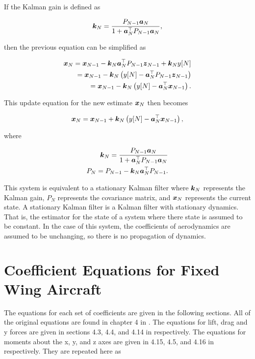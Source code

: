 If the Kalman gain is defined as

\begin{align}
  \boldsymbol{k}_N = \frac{P_{N-1} \boldsymbol{a}_N}{1 + \boldsymbol{a}_N^\top P_{N-1} \boldsymbol{a}_N},
\end{align}

then the previous equation can be simplified as

\begin{align}
    \boldsymbol{x}_N = \boldsymbol{x}_{N-1} - \boldsymbol{k}_N \boldsymbol{a}_N^\top P_{N-1} \boldsymbol{z}_{N-1} + \boldsymbol{k}_N y[N]\\
    = \boldsymbol{x}_{N-1} - \boldsymbol{k}_N \left(y[N] - \boldsymbol{a}_N^\top P_{N-1} \boldsymbol{z}_{N-1}\right)\\
    = \boldsymbol{x}_{N-1} - \boldsymbol{k}_N \left(y[N] - \boldsymbol{a}_N^\top \boldsymbol{x}_{N-1}\right).
\end{align}

This update equation for the new estimate $\boldsymbol{x}_N$ then becomes

\begin{align}
  \boldsymbol{x}_N = \boldsymbol{x}_{N-1} + \boldsymbol{k}_N \left(y[N] - \boldsymbol{a}_N^\top \boldsymbol{x}_{N-1}\right),
\end{align}

where

\begin{align}
    \boldsymbol{k}_N = \frac{P_{N-1} \boldsymbol{a}_N}{1 + \boldsymbol{a}_N^\top P_{N-1} \boldsymbol{a}_N}\\
    P_N = P_{N-1} - \boldsymbol{k}_N \boldsymbol{a}_N^\top P_{N-1}.
\end{align}

This system is equivalent to a stationary Kalman filter where $\boldsymbol{k}_N$ represents the Kalman gain, $P_N$ represents the covariance matrix, and $\boldsymbol{x}_N$ represents the current state.
A stationary Kalman filter is a Kalman filter with stationary dynamics.
That is, the estimator for the state of a system where there state is assumed to be constant.
In the case of this system, the coefficients of aerodynamics are assumed to be unchanging, so there is no propagation of dynamics.

\section{Coefficient Equations for Fixed Wing Aircraft}

\label{sec:equationsOfMotion}

The equations for each set of coefficients are given in the following sections. 
All of the original equations are found in chapter 4 in \cite{uav_book}. 
The equations for lift, drag and y forces are given in sections 4.3, 4.4, and 4.14 in \cite{uav_book} respectively. 
The equations for moments about the x, y, and z axes are given in 4.15, 4.5, and 4.16 in \cite{uav_book} respectively. 
They are repeated here as

